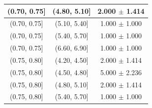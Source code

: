 \begin{longtable}{|c|c|c|}
\hline
(0.70, 0.75] & (4.80, 5.10] & 2.000 $\pm$ 1.414 \\ 
\hline
(0.70, 0.75] & (5.10, 5.40] & 1.000 $\pm$ 1.000 \\ 
\hline
(0.70, 0.75] & (5.40, 5.70] & 1.000 $\pm$ 1.000 \\ 
\hline
(0.70, 0.75] & (6.60, 6.90] & 1.000 $\pm$ 1.000 \\ 
\hline
(0.75, 0.80] & (4.20, 4.50] & 2.000 $\pm$ 1.414 \\ 
\hline
(0.75, 0.80] & (4.50, 4.80] & 5.000 $\pm$ 2.236 \\ 
\hline
(0.75, 0.80] & (4.80, 5.10] & 2.000 $\pm$ 1.414 \\ 
\hline
(0.75, 0.80] & (5.40, 5.70] & 1.000 $\pm$ 1.000 \\ 
\hline
\end{longtable}
